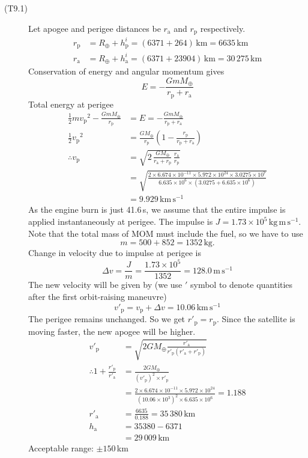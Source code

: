 \begin{description}
\item[(T9.1)]
Let apogee and perigee distances be $r_{\mathrm{a}}$ and $r_{\mathrm{p}}$
respectively.
\begin{align*}
r_{\mathrm{p}} &= R_\oplus + h^i_{\mathrm{p}} = (6371 + 264)\,\mathrm{km}
  = 6635\,\mathrm{km} \\
r_{\mathrm{a}} &= R_\oplus + h^i_{\mathrm{a}} = (6371 + 23904)\,\mathrm{km}
  = 30\,275\,\mathrm{km}
\end{align*}
Conservation of energy and angular momentum gives
\[ E = -\frac{GmM_\oplus}{r_{\mathrm{p}} + r_{\mathrm{a}}} \]
Total energy at perigee
\begin{align*}
\frac{1}{2}m{v_{\mathrm{p}}}^2 - \frac{GmM_\oplus}{r_{\mathrm{p}}}
  &= E = -\frac{GmM_\oplus}{r_{\mathrm{p}} + r_{\mathrm{a}}} \\
\frac{1}{2}{v_{\mathrm{p}}}^2
  &= \frac{GM_\oplus}{r_{\mathrm{p}}}
     \left(1 - \frac{r_{\mathrm{p}}}{r_{\mathrm{p}} + r_{\mathrm{a}}}\right) \\
\therefore v_{\mathrm{p}}
  &= \sqrt{2\,\frac{GM_\oplus}{r_{\mathrm{a}} + r_{\mathrm{p}}}\,
     \frac{r_{\mathrm{a}}}{r_{\mathrm{p}}}} \\
  &= \sqrt{\frac{2 \times 6.674 \times 10^{-11} \times 5.972 \times 10^{24}
     \times 3.0275 \times 10^{7}}
     {6.635 \times 10^{6} \times (3.0275 + 6.635 \times 10^{6})}} \\
  &= 9.929\,\mathrm{km\,s^{-1}}
\end{align*}
As the engine burn is just 41.6\,s, we assume that the entire impulse is
applied instantaneously at perigee. The impulse is
$J = 1.73 \times 10^{5}\,\mathrm{kg\,m\,s^{-1}}$. Note that the total mass of
MOM must include the fuel, so we have to use
\[ m = 500 + 852 = 1352\,\mathrm{kg}. \]
Change in velocity due to impulse at perigee is
\[ \Delta v = \frac{J}{m} = \frac{1.73 \times 10^{5}}{1352}
   = 128.0\,\mathrm{m\,s^{-1}} \]
The new velocity will be given by (we use $'$ symbol to denote quantities
after the first orbit-raising maneuvre)
\[ v'_{\mathrm{p}} = v_{\mathrm{p}} + \Delta v = 10.06\,\mathrm{km\,s^{-1}} \]
The perigee remains unchanged. So we get $r'_{\mathrm{p}} = r_{\mathrm{p}}$.
Since the satellite is moving faster, the new apogee will be higher.
\begin{align*}
v'_{\mathrm{p}}
  &= \sqrt{2GM_\oplus \frac{r'_{\mathrm{a}}}
     {r'_{\mathrm{p}}(r'_{\mathrm{a}} + r'_{\mathrm{p}})}} \\
\therefore 1 + \frac{r'_{\mathrm{p}}}{r'_{\mathrm{a}}}
  &= \frac{2GM_\oplus}{(v'_{\mathrm{p}})^2 \times r'_{\mathrm{p}}} \\
  &= \frac{2 \times 6.674 \times 10^{-11} \times 5.972 \times 10^{24}}
     {(10.06 \times 10^{3})^2 \times 6.635 \times 10^{6}} = 1.188 \\
r'_{\mathrm{a}} &= \frac{6635}{0.188} = 35\,380\,\mathrm{km} \\
h_{\mathrm{a}} &= 35380 - 6371 \\
  &= \boxed{29\,009\,\mathrm{km}}
\end{align*}
Acceptable range: $\pm 150$\,km


\end{description}
